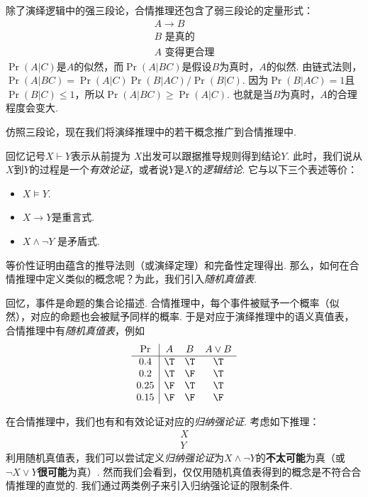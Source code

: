 除了演绎逻辑中的强三段论，合情推理还包含了弱三段论的定量形式：
    \[\begin{array}{c}  
            A \to B \\ B\text{ 是真的} \\ \hline A\text{ 变得更合理}
        \end{array}\]
$\Pr(A|C)$是$A$的似然，而$\Pr(A|BC)$是假设$B$为真时，$A$的似然. 由链式法则，$\Pr(A|BC) = \Pr(A|C)\Pr(B|AC)/\Pr(B|C)$. 因为$\Pr(B|AC) = 1$且$\Pr(B|C)\leq 1$，所以$\Pr(A|BC) \geq \Pr(A|C)$. 也就是当$B$为真时，$A$的合理程度会变大.

仿照三段论，现在我们将演绎推理中的若干概念推广到合情推理中. 

回忆记号$X\vdash Y$表示从前提为 $X$出发可以跟据推导规则得到结论$Y$. 此时，我们说从$X$到$Y$的过程是一个\emph{有效论证}，或者说$Y$是$X$的\emph{逻辑结论}. 它与以下三个表述等价：
    \begin{itemize}
        \item $X\vDash Y$.
        \item  $X\to Y$是重言式.
        \item $X\wedge \neg Y$ 是矛盾式.
    \end{itemize}
等价性证明由蕴含的推导法则（或演绎定理）和完备性定理得出. 那么，如何在合情推理中定义类似的概念呢？为此，我们引入\emph{随机真值表}. 

回忆，事件是命题的集合论描述. 合情推理中，每个事件被赋予一个概率（似然），对应的命题也会被赋予同样的概率. 于是对应于演绎推理中的语义真值表，合情推理中有\emph{随机真值表}，例如
\[
\begin{array}{c|ccc}
    \Pr & A & B & A\vee B \\ \hline
    0.4 & \T & \T & \T \\ 
    0.2 & \T & \F & \T \\ 
    0.25 & \F & \T & \T \\
    0.15 & \F & \F & \F \\
\end{array}
\]

在合情推理中，我们也有和有效论证对应的\emph{归纳强论证}. 考虑如下推理：
	\[\begin{array}{c}
	     X\\\hline
	     Y
	\end{array}\]
利用随机真值表，我们可以尝试定义\emph{归纳强论证}为$X\wedge\neg Y$的\textbf{不太可能}为真（或$\neg X\vee Y$\textbf{很可能}为真）. 然而我们会看到，仅仅用随机真值表得到的概念是不符合合情推理的直觉的. 我们通过两类例子来引入归纳强论证的限制条件.



